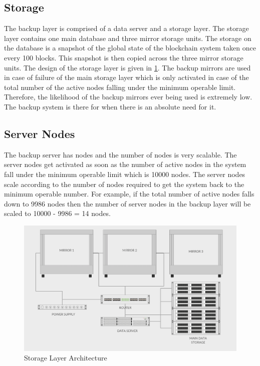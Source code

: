 \documentclass[a4paper,twoside,phd]{BYUPhys}
\begin{document}
\subsection{Storage}
The backup layer is comprised of a data server and a storage layer. The storage layer contains one main database and three mirror storage units. The storage on the database is a snapshot of the global state of the blockchain system taken once every 100 blocks. This snapshot is then copied across the three mirror storage units. The design of the storage layer is given in \ref{fig:3}. The backup mirrors are used in case of failure of the main storage layer which is only activated in case of the total number of the active nodes falling under the minimum operable limit. Therefore, the likelihood of the backup mirrors ever being used is extremely low. The backup system is there for when there is an absolute need for it.

\subsection{Server Nodes}
The backup server has nodes and the number of nodes is very scalable. The server nodes get activated as soon as the number of active nodes in the system fall under the minimum operable limit which is 10000 nodes. The server nodes scale according to the number of nodes required to get the system back to the minimum operable number. For example, if the total number of active nodes falls down to 9986 nodes then the number of server nodes in the backup layer will be scaled to 10000 - 9986 = 14 nodes.
\begin{figure}
  \includegraphics[width=\linewidth]{storage_layer.png}
  \caption{Storage Layer Architecture}
  \label{fig:3}
\end{figure}
\end{document}
